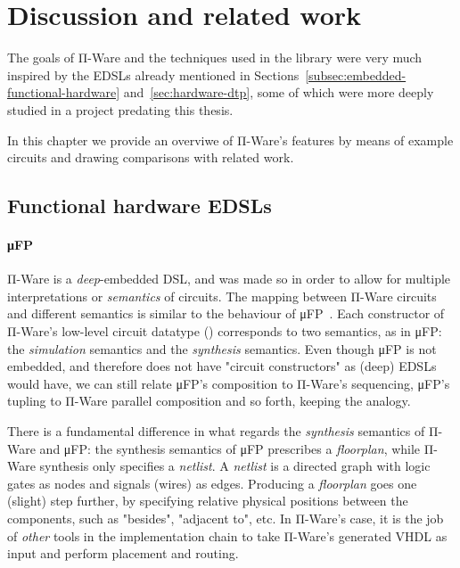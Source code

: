 \chapter{Discussion and related work}
\label{chap:discussion-related-work}

    The goals of Π-Ware and the techniques used in the library were very much inspired by the
    \acp{EDSL} already mentioned in Sections~\ref{subsec:embedded-functional-hardware}
    and~\ref{sec:hardware-dtp}, some of which were more deeply studied in a project
    predating this thesis.

    In this chapter we provide an overviwe of Π-Ware's features by means of example circuits and
    drawing comparisons with related work.

    \section{Functional hardware \acp{EDSL}}
    \label{sec:discussion-functional}

        \subsubsection{μFP}
        Π-Ware is a \emph{deep}-embedded \ac{DSL}, and was made so in order to allow for multiple
        interpretations or \emph{semantics} of circuits.
        The mapping between Π-Ware circuits and different semantics is similar to the behaviour
        of μFP~\cite{mufp-1984}.
        Each constructor of Π-Ware's low-level circuit datatype () corresponds to two
        semantics, as in μFP: the \emph{simulation} semantics and the \emph{synthesis} semantics.
        Even though μFP is not embedded, and therefore does not have "circuit constructors" as
        (deep) \acp{EDSL} would have, we can still relate μFP's composition to Π-Ware's sequencing,
        μFP's tupling to Π-Ware parallel composition and so forth, keeping the analogy.

        There is a fundamental difference in what regards the \emph{synthesis} semantics of Π-Ware
        and μFP: the synthesis semantics of μFP prescribes a \emph{floorplan}, while Π-Ware synthesis
        only specifies a \emph{netlist}.
        A \emph{netlist} is a directed graph with logic gates as nodes and signals (wires) as edges.
        Producing a \emph{floorplan} goes one (slight) step further, by specifying relative
        physical positions between the components, such as "besides", "adjacent to", etc.
        In Π-Ware's case, it is the job of \emph{other} tools in the implementation chain to take
        Π-Ware's generated \ac{VHDL} as input and perform placement and routing.

